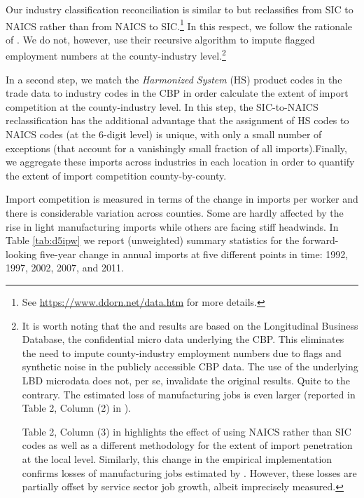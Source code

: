 \documentclass[onehalfspacing,11pt]{article}
\begin{document}
Our industry classification reconciliation is similar to \cite{Autor:2013} but reclassifies from SIC to NAICS rather than from NAICS to SIC.\footnote{See \href{https://www.ddorn.net/data.htm}{https://www.ddorn.net/data.htm} for more details.} In this respect, we follow the rationale of \cite{Eckert:2020}. We do not, however, use their recursive algorithm to impute flagged employment numbers at the county-industry level.\footnote{It is worth noting that the \cite{Bloom:2019} and \cite{Fort:2018} results are based on the Longitudinal Business Database, the confidential micro data underlying the CBP. This eliminates the need to impute county-industry employment numbers due to flags and synthetic noise in the publicly accessible CBP data. The use of the underlying LBD microdata does not, per se, invalidate the original \cite{Autor:2013} results. Quite to the contrary. The estimated loss of manufacturing jobs is even larger (reported in Table 2, Column (2) in \cite{Bloom:2019}).

Table 2, Column (3) in \cite{Bloom:2019} highlights the effect of using NAICS rather than SIC codes as well as a different methodology for the extent of import penetration at the local level. Similarly, this change in the empirical implementation confirms losses of manufacturing jobs estimated by \cite{Autor:2013}. However, these losses are partially offset by service sector job growth, albeit imprecisely measured.}

In a second step, we match the {\it Harmonized System} (HS) product codes in the trade data to industry codes in the CBP in order calculate the extent of import competition at the county-industry level. In this step, the SIC-to-NAICS reclassification has the additional advantage that the assignment of HS codes to NAICS codes (at the 6-digit level) is unique, with only a small number of exceptions (that account for a vanishingly small fraction of all imports).Finally, we aggregate these imports across industries in each location in order to quantify the extent of import competition county-by-county.

Import competition is measured in terms of the change in imports per worker and there is considerable variation across counties. Some are hardly affected by the rise in light manufacturing imports while others are facing stiff headwinds. In Table \ref{tab:d5ipw} we report (unweighted) summary statistics for the forward-looking five-year change in annual imports at five different points in time: 1992, 1997, 2002, 2007, and 2011.
\end{document}
